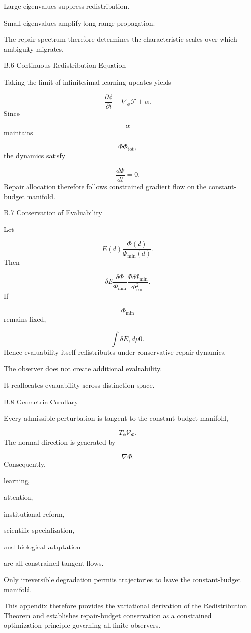 \documentclass[12pt,oneside]{article}
\theoremstyle{plain}
\theoremstyle{definition}
\theoremstyle{remark}
\begin{document}
Large eigenvalues suppress redistribution.

Small eigenvalues amplify long-range propagation.

The repair spectrum therefore determines the characteristic scales over which ambiguity migrates.


B.6 Continuous Redistribution Equation

Taking the limit of infinitesimal learning updates yields

\[
\frac{\partial\phi}{\partial t}
- 
\nabla_\phi
\mathcal F
+
\alpha.
\]
Since

\[
\alpha
\]
maintains

\[
\Phi
\Phi_{\mathrm{tot}},
\]
the dynamics satisfy

\[
\frac{d\Phi}{dt}=0.
\]
Repair allocation therefore follows constrained gradient flow on the constant-budget manifold.


B.7 Conservation of Evaluability

Let

\[
E(d)
\frac{\Phi(d)}
{\Phi_{\min}(d)}.
\]
Then

\[
\delta E
\frac{\delta\Phi}
{\Phi_{\min}}
\frac{\Phi
\delta\Phi_{\min}}
{\Phi_{\min}^2}.
\]
If

\[
\Phi_{\min}
\]
remains fixed,

\[
\int
\delta E
,d\mu
0. 
\]
Hence evaluability itself redistributes under conservative repair dynamics.

The observer does not create additional evaluability.

It reallocates evaluability across distinction space.


B.8 Geometric Corollary

Every admissible perturbation is tangent to the constant-budget manifold,

\[
T_\phi
\mathcal V_\Phi.
\]
The normal direction is generated by

\[
\nabla\Phi.
\]
Consequently,

learning,

attention,

institutional reform,

scientific specialization,

and biological adaptation

are all constrained tangent flows.

Only irreversible degradation permits trajectories to leave the constant-budget manifold.

This appendix therefore provides the variational derivation of the Redistribution Theorem and establishes repair-budget conservation as a constrained optimization principle governing all finite observers.
\end{document}
